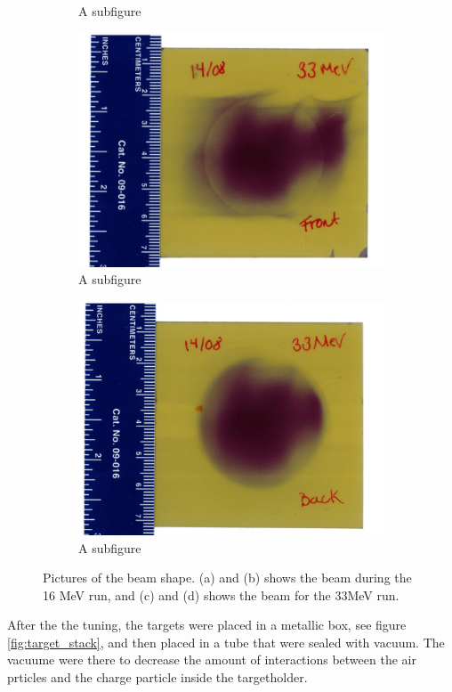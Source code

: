 \documentclass[twoside,english]{uiofysmaster/uiofysmaster}
\begin{document}
\begin{figure} [H]
\begin{subfigure}{.5\textwidth}
  \caption{A subfigure}
  \label{fig:sub2}
\end{subfigure}
\begin{subfigure}{.5\textwidth}
  \centering
  \includegraphics[width=1\linewidth]{33MeV_front.jpeg}
  \caption{A subfigure}
  \label{fig:sub3}
\end{subfigure}%
\begin{subfigure}{.5\textwidth}
  \centering
  \includegraphics[width=1\linewidth]{33MeV_back.jpeg}
  \caption{A subfigure}
  \label{fig:sub4}
\end{subfigure}
\caption{Pictures of the beam shape. (a) and (b) shows the beam during the 16 MeV run, and (c) and (d) shows the beam for the 33MeV run.}
\label{fig:test}
\end{figure}
\noindent
After the the tuning, the targets were placed in a metallic box, see figure \ref{fig:target_stack}, and then placed in a tube that were sealed with vacuum. The vacuume were there to decrease the amount of interactions between the air prticles and the charge particle inside the targetholder. 
\end{document}
